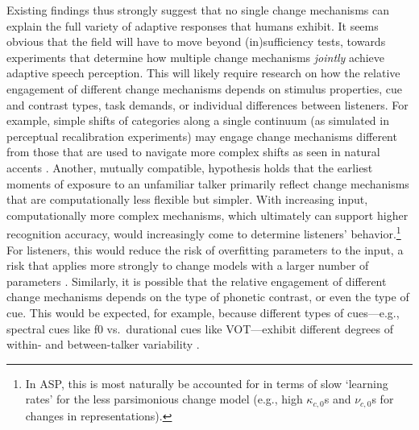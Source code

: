\documentclass[
  11pt,
  man,floatsintext]{apa6}
\begin{document}
Existing findings thus strongly suggest that no single change mechanisms can explain the full variety of adaptive responses that humans exhibit. It seems obvious that the field will have to move beyond (in)sufficiency tests, towards experiments that determine how multiple change mechanisms \emph{jointly} achieve adaptive speech perception. This will likely require research on how the relative engagement of different change mechanisms depends on stimulus properties, cue and contrast types, task demands, or individual differences between listeners. For example, simple shifts of categories along a single continuum (as simulated in perceptual recalibration experiments) may engage change mechanisms different from those that are used to navigate more complex shifts as seen in natural accents \autocites[for discussion, see][]{bent-baeseberk2021,samuel-kraljic2009,zheng-samuel2020}. Another, mutually compatible, hypothesis holds that the earliest moments of exposure to an unfamiliar talker primarily reflect change mechanisms that are computationally less flexible but simpler. With increasing input, computationally more complex mechanisms, which ultimately can support higher recognition accuracy, would increasingly come to determine listeners' behavior.\footnote{In ASP, this is most naturally be accounted for in terms of slow `learning rates' for the less parsimonious change model (e.g., high \(\kappa_{c,0}\)s and \(\nu_{c,0}\)s for changes in representations).} For listeners, this would reduce the risk of overfitting parameters to the input, a risk that applies more strongly to change models with a larger number of parameters \autocites[for discussion, see][]{apfelbaum-mcmurray2015,kleinschmidt-jaeger2015,toscano-mcmurray2010}. Similarly, it is possible that the relative engagement of different change mechanisms depends on the type of phonetic contrast, or even the type of cue. This would be expected, for example, because different types of cues---e.g., spectral cues like f0 vs.~durational cues like VOT---exhibit different degrees of within- and between-talker variability \autocites[see discussions in][p.~179-180]{kleinschmidt-jaeger2015}{kraljic-samuel2007,xie2021cognition}.
\end{document}
